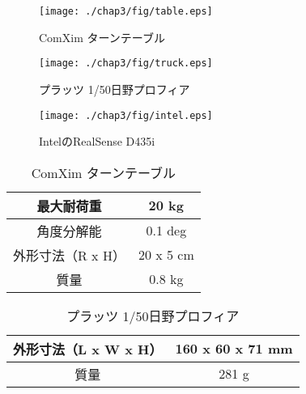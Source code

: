 \begin{figure}[b]
    \begin{minipage}{0.5\hsize}
     \begin{center}
      \texttt{[image: ./chap3/fig/table.eps]}
     \end{center}
     \caption{ComXim ターンテーブル}
     \label{fig:table}
    \end{minipage}
    \begin{minipage}{0.5\hsize}

    \begin{center}
     \texttt{[image: ./chap3/fig/truck.eps]}
    \end{center}
     \caption{プラッツ 1/50日野プロフィア}
     \label{fig:truck}
    \end{minipage}
    
\end{figure}
\clearpage

\begin{figure}[b]
    \begin{center}
    \texttt{[image: ./chap3/fig/intel.eps]}
    \caption{IntelのRealSense D435i}
    \label{fig:intel}
    \end{center}
\end{figure}

\begin{table}[b]
    \begin{center}
    \caption{ComXim ターンテーブル}
    \begin{tabular}{|c|c|}
    \hline
    最大耐荷重     & 20 kg   \\ \hline
    角度分解能     & 0.1 deg \\ \hline
    外形寸法（R x H） & 20 x 5 cm \\ \hline
    質量        & 0.8 kg  \\ \hline
       \end{tabular}
    \label{tab:table}
    \end{center}
\end{table}

\begin{table}[b]
    \begin{center}
    \caption{プラッツ 1/50日野プロフィア}
    \begin{tabular}{|c|c|}
    \hline
    外形寸法（L x W x H） & 160 x 60 x 71 mm \\ \hline
    質量          & 281 g        \\ \hline
    \end{tabular}
    \label{tab:truck}
    \end{center}
\end{table}

